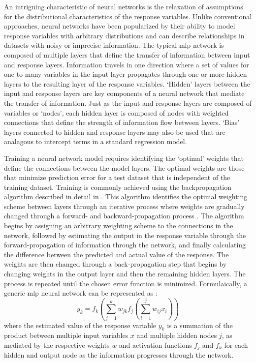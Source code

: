 \documentclass[article,shortnames]{jss}\usepackage[]{graphicx}\usepackage[]{color}
\begin{document}
An intriguing characteristic of neural networks is the relaxation of assumptions for the distributional characteristics of the response variables.  Unlike conventional approaches, neural networks have been popularized by their ability to model response variables with arbitrary distributions and can describe relationships in datasets with noisy or imprecise information.  The typical \ac{mlp} network is composed of multiple layers that define the transfer of information between input and response layers.  Information travels in one direction where a set of values for one to many variables in the input layer propagates through one or more hidden layers to the resulting layer of the response variables. `Hidden' layers between the input and response layers are key components of a neural network that mediate the transfer of information.  Just as the input and response layers are composed of variables or `nodes', each hidden layer is composed of nodes with weighted connections that define the strength of information flow between layers.  `Bias' layers connected to hidden and response layers may also be used that are analagous to intercept terms in a standard regression model.

Training a neural network model requires identifying the `optimal' weights that define the connections between the model layers.  The optimal weights are those that minimize prediction error for a test dataset that is independent of the training dataset.  Training is commonly achieved using the backpropagation algorithm described in detail in \citep{Rumelhart86}.  This algorithm identifies the optimal weighting scheme between layers through an iterative process where weights are gradually changed through a forward- and backward-propagation process \citep{Rumelhart86,Lek00}.  The algorithm begins by assigning an arbitrary weighting scheme to the connections in the network, followed by estimating the output in the response variable through the forward-propagation of information through the network, and finally calculating the difference between the predicted and actual value of the response.  The weights are then changed through a back-propagation step that begins by changing weights in the output layer and then the remaining hidden layers.  The process is repeated until the chosen error function is minimized.  Formulaically, a generic \ac{mlp} neural network can be represented as \citep{Ripley96}:
\begin{equation}
y_k = f_k \left(\sum\limits_{j=1}^k w_{jk}f_j \left( \sum\limits_{i=1}^j w_{ij}x_i\right) \right)
\end{equation}
where the estimated value of the response variable $y_k$ is a summation of the product between multiple input variables $x$ and multiple hidden nodes $j$, as mediated by the respective weights $w$ and activation functions $f_j$ and $f_k$ for each hidden and output node as the information progresses through the network.
\end{document}
